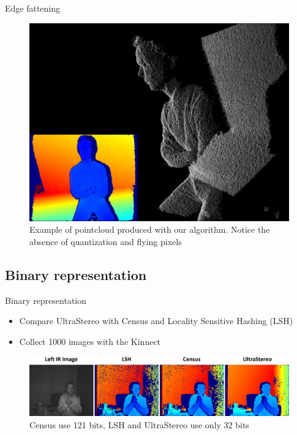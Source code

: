 \begin{frame}{Edge fattening}

\begin{figure}
\includegraphics[scale=0.15]{pictures/fig6}
\caption{Example of pointcloud produced with our algorithm. Notice the absence of quantization and flying pixels}
\end{figure}
\end{frame}

\subsection{Binary representation}
\begin{frame}{Binary representation}
\begin{itemize}
\item Compare UltraStereo with Census and Locality Sensitive Hashing (LSH)
\item Collect 1000 images with the Kinnect
\end{itemize}
\begin{figure}
\includegraphics[scale=0.15]{pictures/fig7}
\caption{Census use 121 bits, LSH and UltraStereo use only 32 bits}
\end{figure}
\end{frame}

